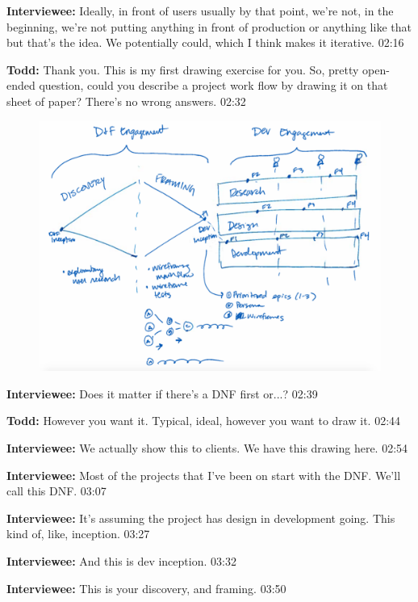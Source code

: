\textbf{Interviewee:} Ideally, in front of users usually by that point, we're not, in the beginning, we're not putting anything in front of production or anything like that but that's the idea. We potentially could, which I think makes it iterative. 02:16

\textbf{Todd:} Thank you. This is my first drawing exercise for you. So, pretty open-ended question, could you describe a project work flow by drawing it on that sheet of paper? There's no wrong answers. 02:32

\begin{figure}[h]
\centering
\includegraphics[width=6.5in]{interviews/drawings/2015_05_29.png}
\caption{}
\label{2015_05_29}
\end{figure}

\textbf{Interviewee:} Does it matter if there's a DNF first or...? 02:39

\textbf{Todd:} However you want it. Typical, ideal, however you want to draw it. 02:44

\textbf{Interviewee:} We actually show this to clients. We have this drawing here. 02:54

\textbf{Interviewee:} Most of the projects that I've been on start with the DNF. We'll call this DNF. 03:07

\textbf{Interviewee:} It's assuming the project has design in development going. This kind of, like, inception. 03:27

\textbf{Interviewee:} And this is dev inception. 03:32

\textbf{Interviewee:} This is your discovery, and framing. 03:50

